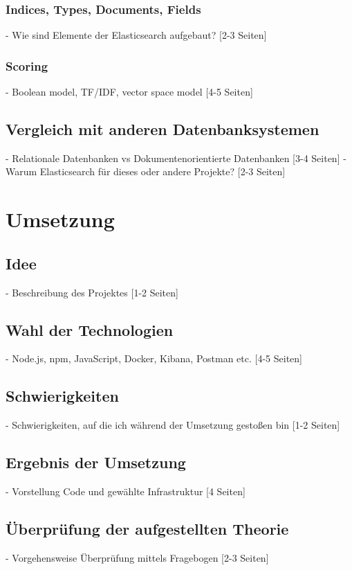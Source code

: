 \documentclass[a4paper]{scrartcl}
\begin{document}
\subsubsection{Indices, Types, Documents, Fields}
    - Wie sind Elemente der Elasticsearch aufgebaut? [2-3 Seiten]
    
\subsubsection{Scoring}
    - Boolean model, TF/IDF, vector space model [4-5 Seiten]
    
\subsection{Vergleich mit anderen Datenbanksystemen}
    - Relationale Datenbanken vs Dokumentenorientierte Datenbanken [3-4 Seiten]
    - Warum Elasticsearch für dieses oder andere Projekte? [2-3 Seiten]
    
\section{Umsetzung}

\subsection{Idee}
    - Beschreibung des Projektes [1-2 Seiten]

\subsection{Wahl der Technologien}
    - Node.js, npm, JavaScript, Docker, Kibana, Postman etc. [4-5 Seiten]

\subsection{Schwierigkeiten}
    - Schwierigkeiten, auf die ich während der Umsetzung gestoßen bin [1-2 Seiten]
    
\subsection{Ergebnis der Umsetzung}
    - Vorstellung Code und gewählte Infrastruktur [4 Seiten]

\subsection{Überprüfung der aufgestellten Theorie}
    - Vorgehensweise Überprüfung mittels Fragebogen [2-3 Seiten]
\end{document}
